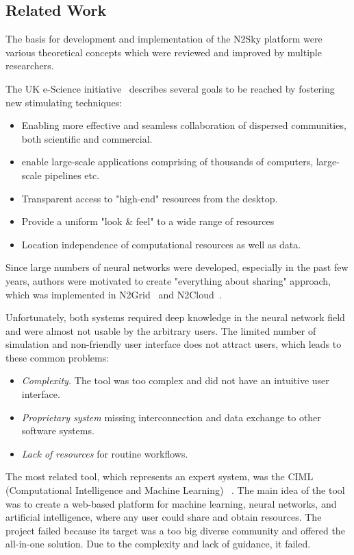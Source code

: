 \subsection{Related Work}\label{Related work}

The basis for development and implementation of the N2Sky platform were various theoretical concepts which were reviewed and improved by multiple researchers.

The UK e-Science initiative~\cite{UKeS} describes several goals to be reached by fostering new stimulating techniques:

\begin{itemize}
  \item Enabling more effective and seamless collaboration of dispersed communities, both scientific and commercial.
  \item enable large-scale applications comprising of thousands of computers, large-scale pipelines etc.
  \item Transparent access to "high-end" resources from the desktop.
  \item Provide a uniform "look \& feel" to a wide range of resources
  \item Location independence of computational resources as well as data. 
\end{itemize}

Since large numbers of neural networks were developed, especially in the past few years, authors were motivated to create "everything about sharing" approach, which was implemented in N2Grid~\cite{schikuta2004n2grid} and N2Cloud~\cite{huqqani2010n2cloud}.

Unfortunately, both systems required deep knowledge in the neural network field and were almost not usable by the arbitrary users. The limited number of simulation and non-friendly user interface does not attract users, which leads to these common problems:

\begin{itemize}
\item \emph{Complexity.} The tool was too complex and did not have an intuitive user interface. 
\item \emph{Proprietary system} missing interconnection and data exchange to other software systems.
\item \emph{Lack of resources} for routine workflows.
\end{itemize}

The most related tool, which represents an expert system, was the CIML (Computational Intelligence and Machine Learning) ~\cite{zurada2009building}. The main idea of the tool was to create a web-based platform for machine learning, neural networks, and artificial intelligence, where any user could share and obtain resources. The project failed because its target was a too big diverse community and offered the all-in-one solution. Due to the complexity and lack of guidance, it failed. 

